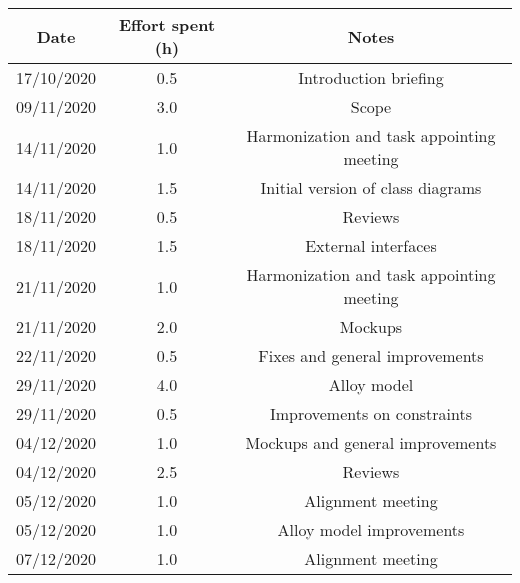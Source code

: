 \documentclass[../../main.tex]{subfiles}
\begin{document}
\begin{center}
    \begin{tabular}{|c| |c| |c|} 
        \hline
        Date & Effort spent (h) & Notes\\ [0.5ex] 
        \hline\hline
        17/10/2020 & 0.5 & Introduction briefing\\ 
        09/11/2020 & 3.0 & Scope\\ 
        14/11/2020 & 1.0 & Harmonization and task appointing meeting\\
        14/11/2020 & 1.5 & Initial version of class diagrams\\
        18/11/2020 & 0.5 & Reviews\\
        18/11/2020 & 1.5 & External interfaces\\
        21/11/2020 & 1.0 & Harmonization and task appointing meeting\\
        21/11/2020 & 2.0 & Mockups\\
        22/11/2020 & 0.5 & Fixes and general improvements\\
        29/11/2020 & 4.0 & Alloy model\\
        29/11/2020 & 0.5 & Improvements on constraints\\
        04/12/2020 & 1.0 & Mockups and general improvements\\
        04/12/2020 & 2.5 & Reviews\\
        05/12/2020 & 1.0 & Alignment meeting\\
        05/12/2020 & 1.0 & Alloy model improvements\\
        07/12/2020 & 1.0 & Alignment meeting\\
        \hline
    \end{tabular}
\end{center}
\end{document}
